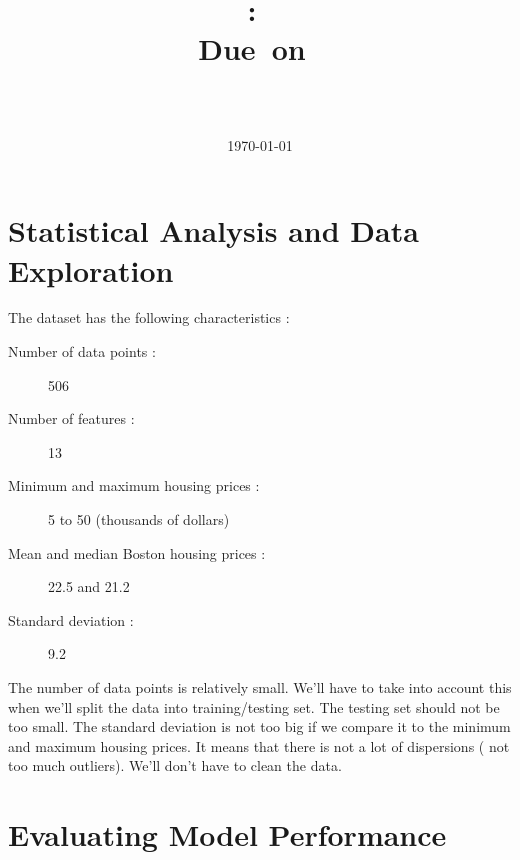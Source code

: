 \documentclass{article}
\title{
\vspace{2in}
\textmd{\textbf{\hmwkClass:\ \hmwkTitle}}\\
\normalsize\vspace{0.1in}\small{Due\ on\ \hmwkDueDate}\\
\vspace{0.1in}\large{\textit{\hmwkClassInstructor\ \hmwkClassTime}}
\author{\textbf{\hmwkAuthorName}}
\date{\today}
\vspace{3in}
}
\begin{document}
\maketitle



\newpage
\tableofcontents
\newpage




\section{Statistical Analysis and Data Exploration}

The dataset has the following characteristics : 

\begin{description}
\item[Number of data points :] 506
\item[Number of features :] 13
\item[Minimum and maximum housing prices :] 5 to 50 (thousands of dollars)
\item[Mean and median Boston housing prices :] 22.5 and 21.2
\item[Standard deviation :] 9.2
\end{description}

The number of data points is relatively small. We'll have to take into account this when we'll split the data into training/testing set. The testing set should not be too small.
The standard deviation is not too big if we compare it to the minimum and maximum housing prices. It means that there is not a lot of dispersions ( not too much outliers). We'll don't have to clean the data.


\section{Evaluating Model Performance}
\end{document}
